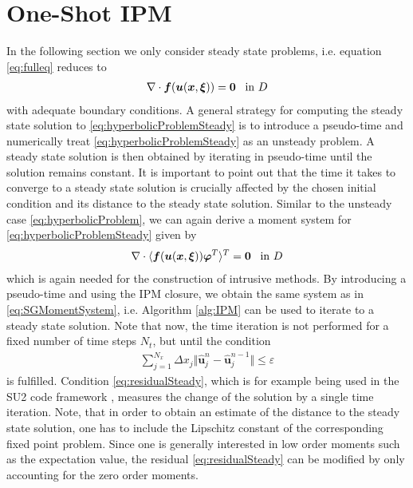 \section{One-Shot IPM}
\label{sec:OneShotIPM}

In the following section we only consider steady state problems, i.e. equation \eqref{eq:fulleq} reduces to
\begin{align}\label{eq:hyperbolicProblemSteady}
\nabla\cdot\bm{f}(\bm{u}(\bm{x},\bm{\xi})) = \bm{0} \enskip \text{ in } D
\end{align}
with adequate boundary conditions. A general strategy for computing the steady state solution to \eqref{eq:hyperbolicProblemSteady} is to introduce a pseudo-time and numerically treat \eqref{eq:hyperbolicProblemSteady} as an unsteady problem. A steady state solution is then obtained by iterating in pseudo-time until the solution remains constant. It is important to point out that the time it takes to converge to a steady state solution is crucially affected by the chosen initial condition and its distance to the steady state solution.
Similar to the unsteady case \eqref{eq:hyperbolicProblem}, we can again derive a moment system for \eqref{eq:hyperbolicProblemSteady} given by
\begin{align}\label{eq:MomentSystemSteady}
\nabla\cdot\langle\bm{f}(\bm{u}(\bm{x},\bm{\xi}))\bm{\varphi}^T\rangle^T = \bm{0} \enskip \text{ in } D
\end{align}
which is again needed for the construction of intrusive methods. By introducing a pseudo-time and using the IPM closure, we obtain the same system as in \eqref{eq:SGMomentSystem}, i.e. Algorithm \ref{alg:IPM} can be used to iterate to a steady state solution. Note that now, the time iteration is not performed for a fixed number of time steps $N_t$, but until the condition
\begin{align}\label{eq:residualSteady}
\sum_{j = 1}^{N_x} \Delta x_j \Vert \bm{\hat{u}}_j^n - \bm{\hat{u}}_j^{n-1} \Vert \leq \varepsilon
\end{align}
is fulfilled. Condition \eqref{eq:residualSteady}, which is for example being used in the SU2 code framework \cite{economon2015su2}, measures the change of the solution by a single time iteration. Note, that in order to obtain an estimate of the distance to the steady state solution, one has to include the Lipschitz constant of the corresponding fixed point problem. Since one is generally interested in low order moments such as the expectation value, the residual \eqref{eq:residualSteady} can be modified by only accounting for the zero order moments.

